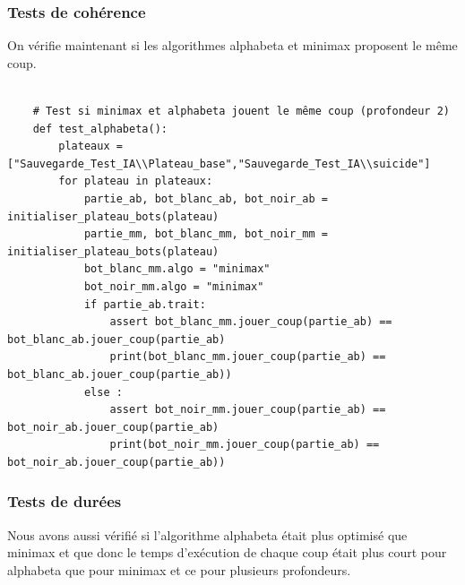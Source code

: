 \documentclass{article}
\begin{document}
\subsubsection{Tests de cohérence}
On vérifie maintenant si les algorithmes alphabeta et minimax proposent le même coup.

\begin{verbatim}

    # Test si minimax et alphabeta jouent le même coup (profondeur 2)
    def test_alphabeta():
        plateaux = ["Sauvegarde_Test_IA\\Plateau_base","Sauvegarde_Test_IA\\suicide"]
        for plateau in plateaux:
            partie_ab, bot_blanc_ab, bot_noir_ab = initialiser_plateau_bots(plateau)
            partie_mm, bot_blanc_mm, bot_noir_mm = initialiser_plateau_bots(plateau)
            bot_blanc_mm.algo = "minimax"
            bot_noir_mm.algo = "minimax"
            if partie_ab.trait:
                assert bot_blanc_mm.jouer_coup(partie_ab) == bot_blanc_ab.jouer_coup(partie_ab)
                print(bot_blanc_mm.jouer_coup(partie_ab) == bot_blanc_ab.jouer_coup(partie_ab))
            else : 
                assert bot_noir_mm.jouer_coup(partie_ab) == bot_noir_ab.jouer_coup(partie_ab)
                print(bot_noir_mm.jouer_coup(partie_ab) == bot_noir_ab.jouer_coup(partie_ab))

\end{verbatim}

\subsubsection{Tests de durées}
Nous avons aussi vérifié si l'algorithme alphabeta était plus optimisé que minimax et que donc le temps d'exécution de chaque coup était plus court pour alphabeta que pour minimax et ce pour plusieurs profondeurs.
\end{document}
